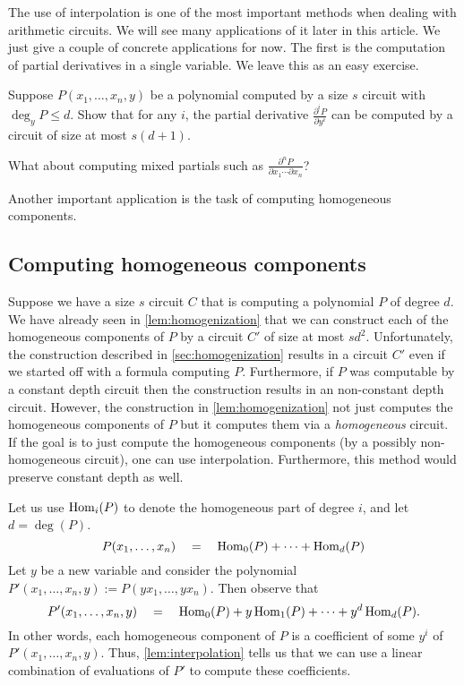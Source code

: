 The use of interpolation is one of the most important methods when dealing with arithmetic circuits. We will see many applications of it later in this article. We just give a couple of concrete applications for now. The first is the computation of partial derivatives in a single variable. We leave this as an easy exercise.

\begin{exercise}
Suppose $P(x_1,\ldots, x_n,y)$ be a polynomial computed by a size $s$ circuit with $\deg_y P \leq d$. Show that for any $i$, the partial derivative
$\frac{\partial^i P}{\partial y^i}$ can be computed by a circuit of size at most $s(d+1)$. 

What about computing mixed partials such as $\frac{\partial^n P}{\partial x_1 \cdots \partial x_n}$?
\end{exercise}

\noindent 
Another important application is the task of computing homogeneous components. 

\subsection{Computing homogeneous components}

Suppose we have a size $s$ circuit $C$ that is computing a polynomial $P$ of degree $d$.
We have already seen in \autoref{lem:homogenization} that we can construct each of the homogeneous components of $P$ by a circuit $C'$ of size at most $sd^2$.
Unfortunately, the construction described in \autoref{sec:homogenization} results in a circuit $C'$ even if we started off with a formula computing $P$.
Furthermore, if $P$ was computable by a constant depth circuit then the construction results in an non-constant depth circuit.
However, the construction in \autoref{lem:homogenization} not just computes the homogeneous components of $P$ but it computes them via a \emph{homogeneous} circuit. If the goal is to just compute the homogeneous components (by a possibly non-homogeneous circuit), one can use interpolation. Furthermore, this method would preserve constant depth as well.

Let us use $\operatorname{Hom}_i(P)$ to denote the homogeneous part of degree $i$, and let $d = \deg(P)$.
\[
P(x_1,\ldots, x_n) \quad = \quad \operatorname{Hom}_0(P) + \cdots + \operatorname{Hom}_d(P)
\]
Let $y$ be a new variable and consider the polynomial $P'(x_1,\ldots, x_n, y) := P(yx_1, \ldots, y x_n)$. Then observe that
\[
P'(x_1,\ldots, x_n,y) \quad = \quad \operatorname{Hom}_0(P) + y\operatorname{Hom}_1(P) + \cdots + y^d \operatorname{Hom}_d(P).
\]
In other words, each homogeneous component of $P$ is a coefficient of some $y^i$ of $P'(x_1,\ldots, x_n,y)$. Thus, \autoref{lem:interpolation} tells us that we can use a linear combination of evaluations of $P'$ to compute these coefficients. 

